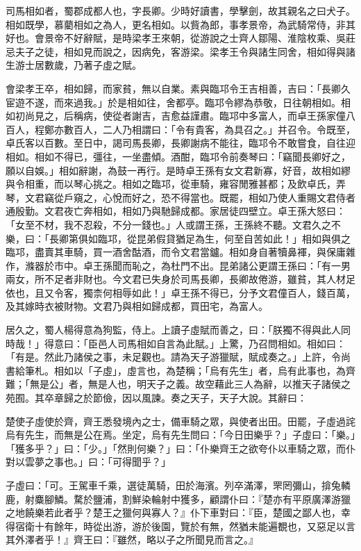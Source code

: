 
\begin{pinyinscope}
司馬相如者，蜀郡成都人也，字長卿。少時好讀書，學擊劍，故其親名之曰犬子。相如既學，慕藺相如之為人，更名相如。以貲為郎，事孝景帝，為武騎常侍，非其好也。會景帝不好辭賦，是時梁孝王來朝，從游說之士齊人鄒陽、淮陰枚乘、吳莊忌夫子之徒，相如見而說之，因病免，客游梁。梁孝王令與諸生同舍，相如得與諸生游士居數歲，乃著子虛之賦。

會梁孝王卒，相如歸，而家貧，無以自業。素與臨邛令王吉相善，吉曰：「長卿久宦遊不遂，而來過我。」於是相如往，舍都亭。臨邛令繆為恭敬，日往朝相如。相如初尚見之，后稱病，使從者謝吉，吉愈益謹肅。臨邛中多富人，而卓王孫家僮八百人，程鄭亦數百人，二人乃相謂曰：「令有貴客，為具召之。」并召令。令既至，卓氏客以百數。至日中，謁司馬長卿，長卿謝病不能往，臨邛令不敢嘗食，自往迎相如。相如不得已，彊往，一坐盡傾。酒酣，臨邛令前奏琴曰：「竊聞長卿好之，願以自娛。」相如辭謝，為鼓一再行。是時卓王孫有女文君新寡，好音，故相如繆與令相重，而以琴心挑之。相如之臨邛，從車騎，雍容閒雅甚都；及飲卓氏，弄琴，文君竊從戶窺之，心悅而好之，恐不得當也。既罷，相如乃使人重賜文君侍者通殷勤。文君夜亡奔相如，相如乃與馳歸成都。家居徒四壁立。卓王孫大怒曰：「女至不材，我不忍殺，不分一錢也。」人或謂王孫，王孫終不聽。文君久之不樂，曰：「長卿第俱如臨邛，從昆弟假貸猶足為生，何至自苦如此！」相如與俱之臨邛，盡賣其車騎，買一酒舍酤酒，而令文君當鑪。相如身自著犢鼻褌，與保庸雜作，滌器於市中。卓王孫聞而恥之，為杜門不出。昆弟諸公更謂王孫曰：「有一男兩女，所不足者非財也。今文君已失身於司馬長卿，長卿故倦游，雖貧，其人材足依也，且又令客，獨柰何相辱如此！」卓王孫不得已，分予文君僮百人，錢百萬，及其嫁時衣被財物。文君乃與相如歸成都，買田宅，為富人。

居久之，蜀人楊得意為狗監，侍上。上讀子虛賦而善之，曰：「朕獨不得與此人同時哉！」得意曰：「臣邑人司馬相如自言為此賦。」上驚，乃召問相如。相如曰：「有是。然此乃諸侯之事，未足觀也。請為天子游獵賦，賦成奏之。」上許，令尚書給筆札。相如以「子虛」，虛言也，為楚稱；「烏有先生」者，烏有此事也，為齊難；「無是公」者，無是人也，明天子之義。故空藉此三人為辭，以推天子諸侯之苑囿。其卒章歸之於節儉，因以風諫。奏之天子，天子大說。其辭曰：

楚使子虛使於齊，齊王悉發境內之士，備車騎之眾，與使者出田。田罷，子虛過詫烏有先生，而無是公在焉。坐定，烏有先生問曰：「今日田樂乎？」子虛曰：「樂。」「獲多乎？」曰：「少。」「然則何樂？」曰：「仆樂齊王之欲夸仆以車騎之眾，而仆對以雲夢之事也。」曰：「可得聞乎？」

子虛曰：「可。王駕車千乘，選徒萬騎，田於海濱。列卒滿澤，罘罔彌山，揜兔轔鹿，射麋腳鱗。騖於鹽浦，割鮮染輪射中獲多，顧謂仆曰：『楚亦有平原廣澤游獵之地饒樂若此者乎？楚王之獵何與寡人？』仆下車對曰：『臣，楚國之鄙人也，幸得宿衛十有餘年，時從出游，游於後園，覽於有無，然猶未能遍覩也，又惡足以言其外澤者乎！』齊王曰：『雖然，略以子之所聞見而言之。』


\end{pinyinscope}
